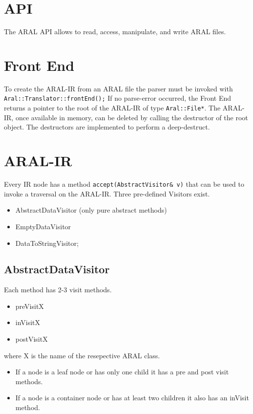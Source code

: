 \documentclass[a4paper,12pt]{report}
\begin{document}
\section{API}

The ARAL API allows to read, access, manipulate, and write ARAL files.

\section{Front End}

To create the ARAL-IR from an ARAL file the parser must be invoked
with \verb+Aral::Translator::frontEnd();+
If no parse-error occurred, the Front End returns a pointer to the
root of the ARAL-IR of type \verb+Aral::File*+.
The ARAL-IR, once available in memory, can be deleted by calling
the destructor of the root object. The destructors are implemented to
perform a deep-destruct.

\section{ARAL-IR}
Every IR node has a method \verb+accept(AbstractVisitor& v)+ that can be used
to invoke a traversal on the ARAL-IR. Three pre-defined Visitors exist.
\begin{itemize}
\item AbstractDataVisitor (only pure abstract methods)
\item EmptyDataVisitor
\item DataToStringVisitor;
\end{itemize}

\subsection{AbstractDataVisitor}

Each method has 2-3 visit methods.

\begin{itemize}
\item preVisitX
\item inVisitX
\item postVisitX
\end{itemize}

where X is the name of the resepective ARAL class.

\begin{itemize}
\item If a node is a leaf node or has only one child it has a pre and post
visit methods.
\item If a node is a container node or has at least two
children it also has an inVisit method.
\end{itemize}
\end{document}
